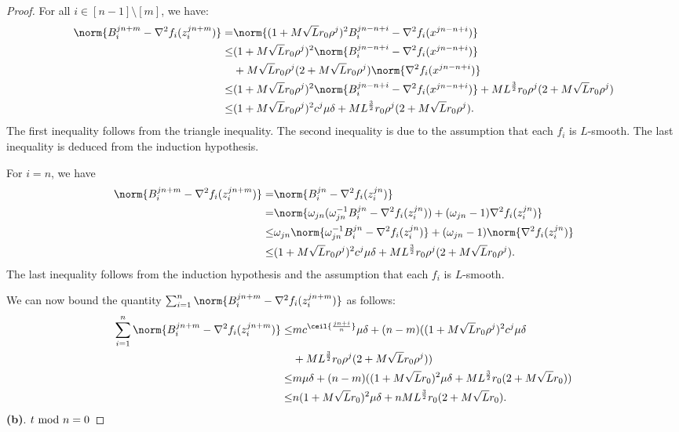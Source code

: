 \begin{proof}
    For all $i \in [n-1] \setminus [m]$, we have:
    \begin{align*}
        \norm{B_i^{j n + m} - \nabla^2 f_i (z_i^{j n + m})} = & \norm{(1 + M\sqrt{L} r_0 \rho^j)^2 B_i^{j n - n + i} - \nabla^2 f_i(x^{j n - n + i})} \\
        \leq & (1 + M \sqrt{L} r_0 \rho^j)^2 \norm{B_i^{j n - n + i} - \nabla^2 f_i (x^{j n - n + i})} \\ 
        & + M \sqrt{L} r_0 \rho^j (2 + M \sqrt{L} r_0 \rho^j) \norm{\nabla^2 f_i(x^{j n - n + i})} \\
        \leq & (1 + M \sqrt{L} r_0 \rho^j)^2 \norm{B_i^{j n - n + i} - \nabla^2 f_i (x^{j n - n + i})} + M L^{\frac{3}{2}} r_0 \rho^j (2 + M \sqrt{L} r_0 \rho^j)  \\
        \leq & (1 + M \sqrt{L} r_0 \rho^j)^2 c^j \mu \delta + M L^{\frac{3}{2}} r_0 \rho^j (2 + M \sqrt{L} r_0 \rho^j).
    \end{align*}
    The first inequality follows from the triangle inequality. The second inequality is due to the assumption that each $f_i$ is $L$-smooth. The last inequality is deduced from the induction hypothesis.
    
    For $i = n$, we have 
    \begin{align*}
        \norm{B_{i}^{j n + m} - \nabla^2 f_i (z_i^{j n + m})} = & \norm{B_i^{j n} - \nabla^2 f_i (z_i^{j n})} \\
         = & \norm{ \omega_{j n} (\omega_{j n}^{-1} B_i^{j n} - \nabla^2 f_i (z_i^{j n})) + (\omega_{j n} - 1) \nabla^2 f_i (z_i^{j n})} \\
         \leq & \omega_{j n} \norm{  \omega_{j n}^{-1} B_i^{j n} - \nabla^2 f_i (z_i^{j n})} + (\omega_{j n} - 1) \norm{ \nabla^2 f_i (z_i^{j n})} \\
         \leq & (1 + M \sqrt{L} r_0 \rho^j)^2 c^j \mu \delta + M L^{\frac{3}{2}} r_0 \rho^j (2 + M \sqrt{L} r_0 \rho^j).
    \end{align*}
    The last inequality follows from the induction hypothesis and the assumption that each $f_i$ is $L$-smooth.

    We can now bound the quantity $\sum_{i=1}^n \norm{B_i^{j n + m} - \nabla^2 f_i(z_i^{j n + m})}$ as follows:
    \begin{equation}
    \begin{split}
        \sum_{i=1}^n \norm{B_i^{j n + m} - \nabla^2 f_i(z_i^{j n + m})} \leq & m c^{\ceil{\frac{j n + i}{n}}}\mu \delta + (n - m) ((1 + M \sqrt{L} r_0 \rho^j)^2 c^j \mu \delta \\ 
        & + M L^{\frac{3}{2}} r_0 \rho^j (2 + M \sqrt{L} r_0 \rho^j)) \\
        \leq & m \mu \delta + (n - m) ((1 + M \sqrt{L} r_0 )^2 \mu \delta  + M L^{\frac{3}{2}} r_0  (2 + M \sqrt{L} r_0 )) \\
        \leq & n (1 + M \sqrt{L} r_0 )^2 \mu \delta + n  M L^{\frac{3}{2}} r_0  (2 + M \sqrt{L} r_0 ).
    \end{split}
    \label{eq:matrix_diff_1}
    \end{equation}
    \textbf{(b)}. $t~{\rm mod}~n = 0$


\end{proof}
